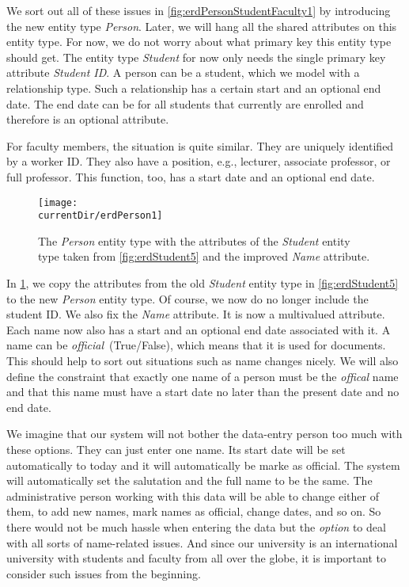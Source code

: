We sort out all of these issues in \cref{fig:erdPersonStudentFaculty1} by introducing the new entity type \emph{Person}.
Later, we will hang all the shared attributes on this entity type.
For now, we do not worry about what primary key this entity type should get.
The entity type \emph{Student} for now only needs the single primary key attribute \emph{Student ID}.
A person can be a student, which we model with a relationship type.
Such a relationship has a certain start and an optional end date.
The end date can be  for all students that currently are enrolled and therefore is an optional attribute.

For faculty members, the situation is quite similar.
They are uniquely identified by a worker ID.
They also have a position, e.g., lecturer, associate professor, or full professor.
This function, too, has a start date and an optional end date.

\begin{figure}%
\centering%
\texttt{[image: \\currentDir/erdPerson1]}%
\caption{The \emph{Person} entity type with the attributes of the \emph{Student} entity type taken from \cref{fig:erdStudent5} and the improved \emph{Name} attribute.}%
\label{fig:erdPerson1}%
\end{figure}%
%
In \cref{fig:erdPerson1}, we copy the attributes from the old \emph{Student} entity type in \cref{fig:erdStudent5} to the new \emph{Person} entity type.
Of course, we now do no longer include the student ID.
We also fix the \emph{Name} attribute.
It is now a multivalued attribute.
Each name now also has a start and an optional end date associated with it.
A name can be \emph{official}~(True/False), which means that it is used for documents.
This should help to sort out situations such as name changes nicely.
We will also define the constraint that exactly one name of a person must be the \emph{offical} name and that this name must have a start date no later than the present date and no end date.

We imagine that our system will not bother the data-entry person too much with these options.
They can just enter one name.
Its start date will be set automatically to today and it will automatically be marke as official.
The system will automatically set the salutation and the full name to be the same.
The administrative person working with this data will be able to change either of them, to add new names, mark names as official, change dates, and so on.
So there would not be much hassle when entering the data but the \emph{option} to deal with all sorts of name-related issues.
And since our university is an international university with students and faculty from all over the globe, it is important to consider such issues from the beginning.

